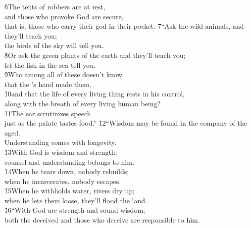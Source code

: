 \begin{poetry}
\poeml \v{6}The tents of robbers are at rest, \\
\poemll    and those who provoke God are secure, \\
\poemlll       that is, those who carry their god in their pocket.
\poeml \v{7}``Ask the wild animals, and they'll teach you; \\
\poemll    the birds of the sky will tell you. \\
\poeml \v{8}Or ask the green plants of the earth and they'll teach you; \\
\poemll    let the fish in the sea tell you. \\
\poeml \v{9}Who among all of these doesn't know \\
\poemll    that the 's hand made them, \\
\poeml \v{10}and that the life of every living thing rests in his control, \\
\poemll    along with the breath of every living human being? \\
\poeml \v{11}The ear scrutinizes speech \\
\poemll    just as the palate tastes food.''
\poeml \v{12}``Wisdom may be found in the company of the aged. \\
\poemll    Understanding comes with longevity. \\
\poeml \v{13}With God is wisdom and strength; \\
\poemll    counsel and understanding belongs to him. \\
\poeml \v{14}When he tears down, nobody rebuilds; \\
\poemll    when he incarcerates, nobody escapes. \\
\poeml \v{15}When he withholds water, rivers dry up; \\
\poemll    when he lets them loose, they'll flood the land. \\
\poeml \v{16}``With God are strength and sound wisdom; \\
\poemll    both the deceived and those who deceive are responsible to him. \\

\end{poetry}
